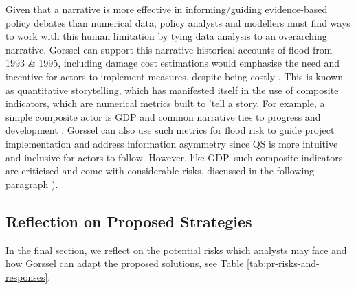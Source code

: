 Given that a narrative is more effective in informing/guiding evidence-based policy debates than numerical data, policy analysts and modellers must find ways to work with this human limitation by tying data analysis to an overarching narrative. Gorssel can support this narrative historical accounts of flood from 1993 \& 1995, including damage cost estimations would emphasise the need and incentive for actors to implement measures, despite being costly \parencite{rijke_room_2012}. This is known as quantitative storytelling, which has manifested itself in the use of composite indicators, which are numerical metrics built to 'tell a story. For example, a simple composite actor is GDP and common narrative ties to progress and development \parencite{kuc-czarnecka_quantitative_2020}. Gorssel can also use such metrics for flood risk to guide project implementation and address information asymmetry since QS is more intuitive and inclusive for actors to follow. However, like GDP, such composite indicators are criticised and come with considerable risks, discussed in the following paragraph \parencite{kuc-czarnecka_quantitative_2020}).

\subsection{Reflection on Proposed Strategies}

In the final section, we reflect on the potential risks which analysts may face and how Gorssel can adapt the proposed solutions, see Table \ref{tab:pr-risks-and-responses}.

\bigskip

